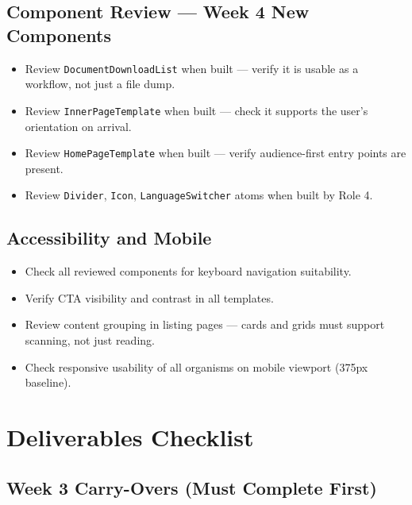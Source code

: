 \documentclass[12pt,a4paper]{article}
\begin{document}
\subsection{Component Review --- Week 4 New Components}

\begin{itemize}
    \item[$\square$] Review \texttt{DocumentDownloadList} when built --- verify it is usable as a workflow, not just a file dump.
    \item[$\square$] Review \texttt{InnerPageTemplate} when built --- check it supports the user's orientation on arrival.
    \item[$\square$] Review \texttt{HomePageTemplate} when built --- verify audience-first entry points are present.
    \item[$\square$] Review \texttt{Divider}, \texttt{Icon}, \texttt{LanguageSwitcher} atoms when built by Role 4.
\end{itemize}

\subsection{Accessibility and Mobile}

\begin{itemize}
    \item[$\square$] Check all reviewed components for keyboard navigation suitability.
    \item[$\square$] Verify CTA visibility and contrast in all templates.
    \item[$\square$] Review content grouping in listing pages --- cards and grids must support scanning, not just reading.
    \item[$\square$] Check responsive usability of all organisms on mobile viewport (375px baseline).
\end{itemize}

\section{Deliverables Checklist}

\subsection{Week 3 Carry-Overs (Must Complete First)}
\end{document}
